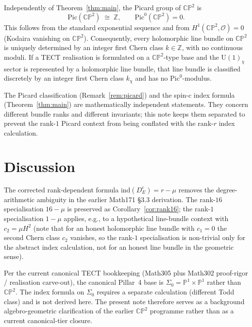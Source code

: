 \begin{remark}
\label{rem:picard}
Independently of Theorem~\ref{thm:main}, the Picard group of
$\mathbb{CP}^2$ is
\[
\mathrm{Pic}(\mathbb{CP}^2) \;\cong\; \mathbb{Z}, \qquad
\mathrm{Pic}^0(\mathbb{CP}^2) = 0.
\]
This follows from the standard exponential sequence and from
$H^1(\mathbb{CP}^2, \mathcal{O}) = 0$ (Kodaira vanishing on
$\mathbb{CP}^2$). Consequently, every holomorphic line bundle on
$\mathbb{CP}^2$ is uniquely determined by an integer first Chern class
$k \in \mathbb{Z}$, with no continuous moduli. If a TECT realisation is
formulated on a $\mathbb{CP}^2$-type base and the U$(1)_\chi$ sector is
represented by a holomorphic line bundle, that line bundle is
classified discretely by an integer first Chern class $k_\chi$ and has
no $\mathrm{Pic}^0$-modulus.
\end{remark}

The Picard classification (Remark~\ref{rem:picard}) and the spin-c index
formula (Theorem~\ref{thm:main}) are mathematically independent
statements. They concern different bundle ranks and different invariants;
this note keeps them separated to prevent the rank-$1$ Picard context
from being conflated with the rank-$r$ index calculation.

\section{Discussion}

The corrected rank-dependent formula $\mathrm{ind}(D_E^c) = r - \mu$
removes the degree-arithmetic ambiguity in the earlier Math171 \S3.3
derivation. The rank-$16$ specialisation $16 - \mu$ is preserved as
Corollary~\ref{cor:rank16}; the rank-$1$ specialisation $1 - \mu$
applies, e.g., to a hypothetical line-bundle context with $c_2 = \mu
H^2$ (note that for an honest holomorphic line bundle with $c_1 = 0$
the second Chern class $c_2$ vanishes, so the rank-$1$ specialisation
is non-trivial only for the abstract index calculation, not for an
honest line bundle in the geometric sense).

Per the current canonical TECT bookkeeping (Math305 plus Math302
proof-rigor / realisation carve-out), the canonical Pillar~4 base is
$\Sigma_0 = \mathbb{P}^1 \times \mathbb{P}^1$ rather than
$\mathbb{CP}^2$. The index formula on $\Sigma_0$ requires a separate
calculation (different Todd class) and is not derived here. The present
note therefore serves as a background algebro-geometric clarification
of the earlier $\mathbb{CP}^2$ programme rather than as a current
canonical-tier closure.

